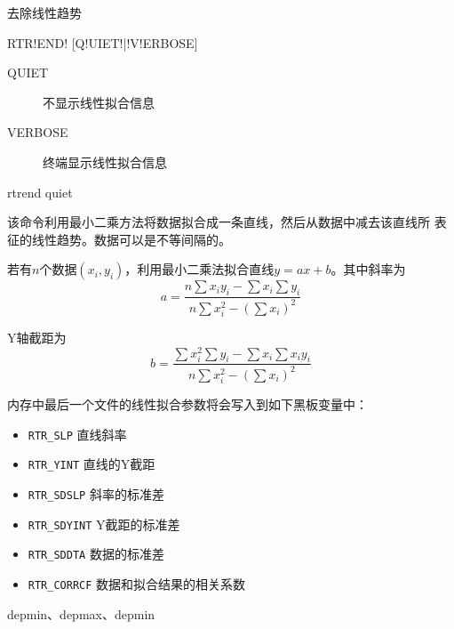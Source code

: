 \label{cmd:rtrend}

去除线性趋势

\begin{SACSTX}
RTR!END! [Q!UIET!|!V!ERBOSE]
\end{SACSTX}

\begin{description}
\item [QUIET] 不显示线性拟合信息
\item [VERBOSE] 终端显示线性拟合信息
\end{description}

\begin{SACDFT}
rtrend quiet
\end{SACDFT}

该命令利用最小二乘方法将数据拟合成一条直线，然后从数据中减去该直线所
表征的线性趋势。数据可以是不等间隔的。

若有$n$个数据$(x_i,y_i)$，利用最小二乘法拟合直线$y=ax+b$。其中斜率为
\[
    a = \frac{n\sum x_i y_i - \sum x_i \sum y_i}
    {n\sum x_i^2 - (\sum x_i)^2}
\]

Y轴截距为
\[
    b = \frac{\sum x_i^2 \sum y_i - \sum x_i \sum x_i y_i}
    {n\sum x_i^2 - (\sum x_i)^2}
\]

内存中最后一个文件的线性拟合参数将会写入到如下黑板变量中：
\begin{itemize}
\item \verb|RTR_SLP| 直线斜率
\item \verb|RTR_YINT| 直线的Y截距
\item \verb|RTR_SDSLP| 斜率的标准差
\item \verb|RTR_SDYINT| Y截距的标准差
\item \verb|RTR_SDDTA| 数据的标准差
\item \verb|RTR_CORRCF| 数据和拟合结果的相关系数
\end{itemize}

depmin、depmax、depmin
